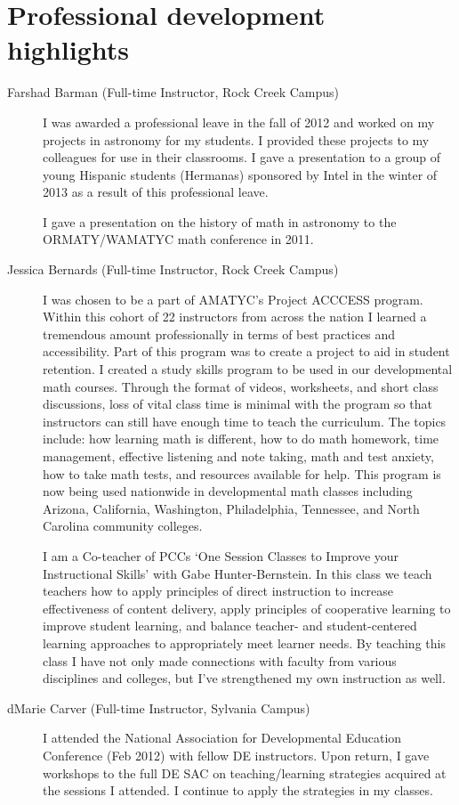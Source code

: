 \chapter{Professional development highlights}\label{app:sec:professionaldevelop}

\begin{description}
	\item[Farshad Barman (Full-time Instructor, Rock Creek Campus)]
	I was awarded a professional leave in the fall of 2012 and worked on my
	projects in astronomy for my students. I provided these projects to my
	colleagues for use in their classrooms. I gave a presentation to a group of
	young Hispanic students (Hermanas) sponsored by Intel in the winter of 2013 as
	a result of this professional leave.

	I gave a presentation on the history of math in astronomy to the ORMATY/WAMATYC
	math conference in 2011.
	\item[Jessica Bernards (Full-time Instructor, Rock Creek Campus)]
	I was chosen to be a part of AMATYC's Project ACCCESS program.  Within
	this cohort of 22 instructors from across the nation I learned a tremendous
	amount professionally in terms of best practices and accessibility.  Part
	of this program was to create a project to aid in student retention.  I
	created a study skills program to be used in our developmental math
	courses.  Through the format of videos, worksheets, and short class
	discussions, loss of vital class time is minimal with the program so that
	instructors can still have enough time to teach the curriculum.  The topics
	include: how learning math is different, how to do math homework, time
	management, effective listening and note taking, math and test anxiety, how
	to take math tests, and resources available for help.  This program is now
	being used nationwide in developmental math classes including Arizona,
	California, Washington, Philadelphia, Tennessee, and North Carolina
	community colleges.

	I am a Co-teacher of PCCs `One Session Classes to Improve your
	Instructional Skills' with Gabe Hunter-Bernstein. In this class we teach
	teachers how to apply principles of direct instruction to increase
	effectiveness of content delivery, apply principles of cooperative learning
	to improve student learning, and balance teacher- and student-centered
	learning approaches to appropriately meet learner needs.  By teaching this
	class I have not only made connections with faculty from various
	disciplines and colleges, but I've strengthened my own instruction as well.
	\item[dMarie Carver (Full-time Instructor, Sylvania Campus)]
	I attended the National Association for Developmental Education Conference
	(Feb 2012) with fellow DE instructors.  Upon return, I gave workshops to
	the full DE SAC on teaching/learning strategies acquired at the sessions I
	attended.  I continue to apply the strategies in my classes.


\end{description}
